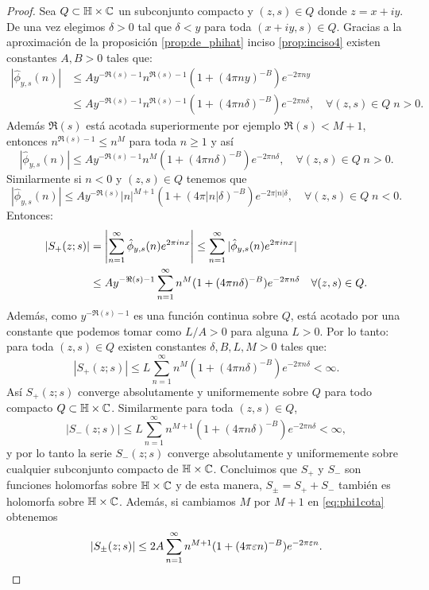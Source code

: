 \documentclass[../../tesis_maestria]{subfiles}
\begin{document}
\begin{proof}
  Sea $Q\subset\mathbb{H}\times\mathbb{C}$ un subconjunto compacto y $(z,s)\in Q$ donde $z=x+iy$.
  De una vez elegimos $\delta>0$ tal que $\delta<y$ para toda $(x+iy,s)\in Q$.
  Gracias a la aproximaci\'on de la proposici\'on \ref{prop:de_phihat} inciso
  \ref{prop:inciso4} existen constantes $A,B>0$ tales que:
  \begin{align*}
    |\hat{\phi}_{y,s}(n)|
    &\leq A y^{-\Re(s)-1}n^{\Re(s)-1}(1+(4\pi ny)^{-B})e^{-2\pi ny}\\
    &\leq A y^{-\Re(s)-1}n^{\Re(s)-1}(1+(4\pi n\delta)^{-B})e^{-2\pi n\delta},
      \quad\forall(z,s)\in Q\; n>0.
  \end{align*}
  Adem\'as $\Re(s)$ est\'a acotada superiormente por ejemplo $\Re(s)<M+1$, entonces
  $n^{\Re(s)-1}\leq n^M$ para toda $n\geq1$ y as\'i
  \begin{equation}\label{eq:phihataprox1}
    |\hat{\phi}_{y,s}(n)|\leq A y^{-\Re(s)-1}n^M(1+(4\pi n\delta)^{-B})e^{-2\pi n\delta},
    \quad\forall(z,s)\in Q\; n>0.
  \end{equation}
  Similarmente si $n<0$ y $(z,s)\in Q$ tenemos que
  \begin{equation}\label{eq:phihataprox2}
    |\hat{\phi}_{y,s}(n)|\leq A y^{-\Re(s)}|n|^{M+1}(1+(4\pi|n|\delta)^{-B})e^{-2\pi|n|\delta},
    \quad\forall(z,s)\in Q\; n<0.
  \end{equation}
  Entonces:
  \begin{align*}
    |S_+(z;s)|
    &=\left| \sum_{n=1}^{\infty}\hat{\phi}_{y,s}(n)e^{2\pi i n x} \right|
    \leq\sum_{n=1}^{\infty}|\hat{\phi}_{y,s}(n)e^{2\pi i n x}|\\
    &\leq A y^{-\Re(s)-1}\sum_{n=1}^{\infty}n^M(1+(4\pi n\delta)^{-B})e^{-2\pi n\delta}
      \quad\forall (z,s)\in Q.
  \end{align*}
  Adem\'as, como $y^{-\Re(s)-1}$ es una funci\'on continua sobre $Q$,
  est\'a acotado por una constante que podemos tomar como $L/A>0$ para alguna $L>0$.
  Por lo tanto: para toda $(z,s)\in Q$ existen constantes $\delta,B,L,M>0$ tales que:
  \begin{equation}\label{eq:phi1cota}
    |S_+(z;s)|\leq L\sum_{n=1}^{\infty}n^M(1+(4\pi n\delta)^{-B})e^{-2\pi n\delta}<\infty.
  \end{equation}
  As\'i $S_+(z;s)$ converge absolutamente y uniformemente sobre $Q$ para todo
  compacto $Q\subset\mathbb{H}\times\mathbb{C}$. Similarmente para toda $(z,s)\in Q$,
  \[
    |S_-(z;s)|\leq L\sum_{n=1}^{\infty}n^{M+1}(1+(4\pi n\delta)^{-B})e^{-2\pi n\delta}<\infty,
  \]
  y por lo tanto la serie $S_-(z;s)$ converge absolutamente y uniformemente sobre
  cualquier subconjunto compacto de $\mathbb{H}\times\mathbb{C}$.
  Concluimos que $S_+$ y $S_-$ son funciones holomorfas sobre $\mathbb{H}\times\mathbb{C}$ y
  de esta manera, $S_{\pm}=S_++S_-$ tambi\'en es holomorfa sobre $\mathbb{H}\times\mathbb{C}$.
  Adem\'as, si cambiamos $M$ por $M+1$ en \eqref{eq:phi1cota} obtenemos
  \begin{equation}
    \label{eq:approxPhi}
    |S_{\pm}(z;s)|\leq 2A\sum_{n=1}^{\infty}n^{M+1}(1+(4\pi\varepsilon n)^{-B})e^{-2\pi\varepsilon n}.
  \end{equation}


\end{proof}
\end{document}
